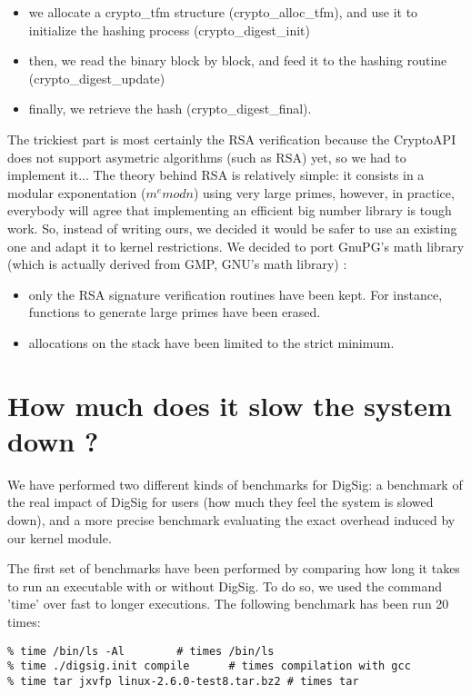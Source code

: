 \documentclass{article}
\begin{document}
\begin{itemize} 
\item we allocate a crypto\_tfm structure (crypto\_alloc\_tfm), and use
  it to initialize the hashing process (crypto\_digest\_init)
\item then, we read the binary block by block, and feed it to the hashing
  routine (crypto\_digest\_update)
\item finally, we retrieve the hash (crypto\_digest\_final).
\end{itemize} 
The trickiest part is most certainly the RSA verification because
the CryptoAPI does not support asymetric algorithms (such as RSA) yet,
so we had to implement it... The theory behind RSA is relatively
simple: it consists in a modular exponentation ($m^e mod n$) using
very large primes, however, in practice, everybody will agree that 
implementing an efficient big number library is tough work. 
So, instead of writing ours, we decided it would be safer to use
an existing one and adapt it to kernel restrictions.
We decided to port GnuPG's math library (which is
actually derived from GMP, GNU's math library) \cite{GnuPG}:
\begin{itemize} 
\item only the RSA signature verification routines have been kept. 
  For instance, functions to generate large primes have been erased.
\item allocations on the stack have been limited to the strict minimum.
\end{itemize} 

\section{How much does it slow the system down ?} 

We have performed two different kinds of benchmarks for DigSig: 
a benchmark of the real impact of DigSig for users (how much they
feel the system is slowed down), and a more precise benchmark
evaluating the exact overhead induced by our kernel module.

The first set of benchmarks have been performed by comparing
how long it takes to run an executable with or without DigSig.
To do so, we used the command 'time' over fast to longer executions. 
The following benchmark has been run 20 times:

\small
\begin{verbatim} 
% time /bin/ls -Al		  # times /bin/ls
% time ./digsig.init compile      # times compilation with gcc
% time tar jxvfp linux-2.6.0-test8.tar.bz2 # times tar
\end{verbatim} 
\normalsize
\end{document}
